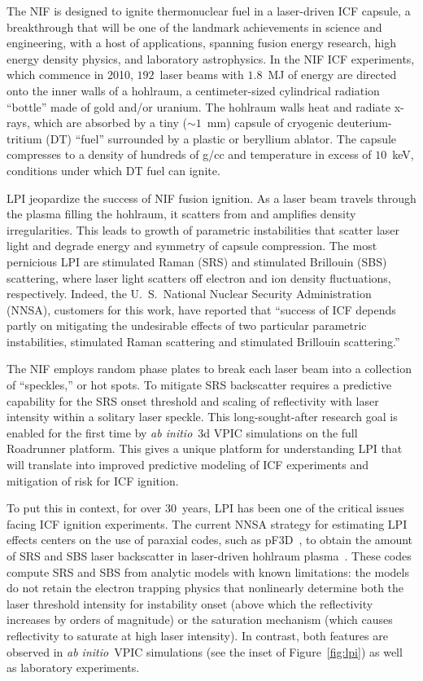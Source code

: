 \documentclass[journal,twoside]{IEEEtran}
\newcommand{\fig}[1]{Figure~\ref{fig:#1}}
\newcommand{\abinitio} {\textit{ab initio}}
\begin{document}
The NIF is designed to ignite thermonuclear fuel in a laser-driven ICF
capsule, a breakthrough that will be one of the landmark achievements
in science and engineering, with a host of applications, spanning
fusion energy research, high energy density physics, and laboratory
astrophysics.  In the NIF ICF experiments, which commence in 2010,
$192$~laser beams with $1.8$~MJ of energy are directed onto the inner
walls of a hohlraum, a centimeter-sized cylindrical radiation
``bottle'' made of gold and/or uranium.  The hohlraum walls heat and
radiate x-rays, which are absorbed by a tiny ($\sim 1$~mm) capsule of
cryogenic deuterium-tritium (DT) ``fuel'' surrounded by a plastic or
beryllium ablator.  The capsule compresses to a density of hundreds of
g/cc and temperature in excess of $10$~keV, conditions under which DT
fuel can ignite.

LPI jeopardize the success of NIF fusion ignition.  As a laser beam
travels through the plasma filling the hohlraum, it scatters from and
amplifies density irregularities.  This leads to growth of parametric
instabilities that scatter laser light and degrade energy and symmetry
of capsule compression.  The most pernicious LPI are stimulated Raman
(SRS) and stimulated Brillouin (SBS) scattering, where laser light
scatters off electron and ion density fluctuations, respectively.
Indeed, the U.~S.~National Nuclear Security Administration (NNSA),
customers for this work, have reported that ``success of ICF depends
partly on mitigating the undesirable effects of two particular
parametric instabilities, stimulated Raman scattering and stimulated
Brillouin scattering.''~\cite{LLNL_LPI_webpage}

The NIF employs random phase plates to break each laser beam into a
collection of ``speckles,'' or hot spots.  To mitigate SRS backscatter
requires a predictive capability for the SRS onset threshold and
scaling of reflectivity with laser intensity within a solitary laser
speckle.  This long-sought-after research goal is enabled for the
first time by \abinitio\ 3d VPIC simulations on the full Roadrunner platform.  This
gives a unique platform for understanding LPI that will translate into
improved predictive modeling of ICF experiments and mitigation of risk
for ICF ignition.

To put this in context, for over $30$~years, LPI has been one of the
critical issues facing ICF ignition experiments.  The current NNSA
strategy for estimating LPI effects centers on the use of paraxial
codes, such as pF3D~\cite{Berger_Phys_Plasmas_1998}, to obtain the
amount of SRS and SBS laser backscatter in laser-driven hohlraum
plasma~\cite{Glenzer_Nature_Physics_2007,Labaune_Nature_Physics_2007}.
These codes compute SRS and SBS from analytic models with known
limitations: the models do not retain the electron trapping physics
that nonlinearly determine both the laser threshold intensity for
instability onset (above which the reflectivity increases by orders of
magnitude) or the saturation mechanism (which causes reflectivity to
saturate at high laser intensity).  In contrast, both features are
observed in \abinitio\ VPIC simulations (see the inset of
\fig{lpi}) as well as laboratory
experiments.~\cite{Montgomery_et_al_Phys_Plasmas_2002}
\end{document}
